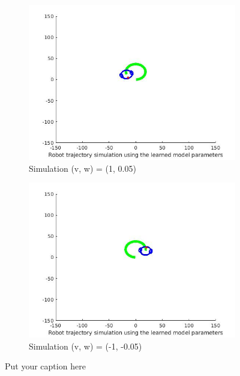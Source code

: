 \documentclass{article}
\begin{document}
\begin{figure}[ht]
\begin{subfigure}{.5\textwidth}
	\end{subfigure}
	\begin{subfigure}{.5\textwidth}
		\centering
		\includegraphics[width=1.\linewidth]{3.jpg}  
		\caption{Simulation (v, w) = (1, 0.05)}
		\label{fig:sub-first}
	\end{subfigure}
	\begin{subfigure}{.5\textwidth}
		\centering
		\includegraphics[width=1.\linewidth]{4.jpg}  
		\caption{Simulation (v, w) = (-1, -0.05)}
		\label{fig:sub-second}
	\end{subfigure}
	\caption{Put your caption here}
	\label{fig:fig}
\end{figure}
\newpage
\end{document}
